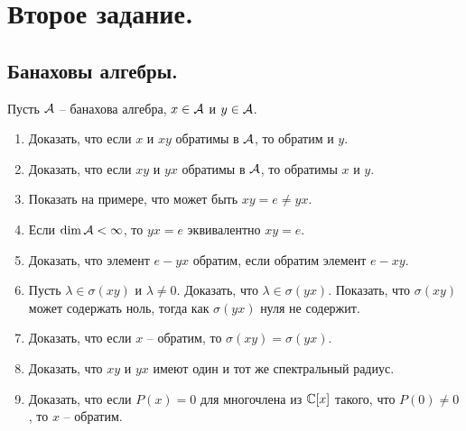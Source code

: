 \chapter{Второе задание.}
\section{Банаховы алгебры.}
\begin{task}[T1]
    Пусть $\mathcal{A}$ -- банахова алгебра, $x \in \mathcal{A}$ и $y \in \mathcal{A}$.
    \begin{enumerate}
        \item Доказать, что если $x$ и $xy$ обратимы в $\mathcal{A}$, то обратим и $y$.
        \item Доказать, что если $xy$ и $yx$ обратимы в $\mathcal{A}$, то обратимы $x$ и $y$.
        \item Показать на примере, что может быть $xy = e \neq yx$.
        \item Если $\dim \mathcal{A} < \infty$, то $yx = e$ эквивалентно $xy = e$.
        \item Доказать, что элемент $e - yx$ обратим, если обратим элемент $e - xy$.
        \item Пусть $\lambda \in \sigma(xy)$ и $\lambda \neq 0$.
        Доказать, что $\lambda \in \sigma(yx)$.
        Показать, что $\sigma(xy)$ может содержать ноль, тогда как $\sigma(yx)$ нуля не содержит.
        \item Доказать, что если $x$ -- обратим, то $\sigma(xy) = \sigma(yx)$.
        \item Доказать, что $xy$ и $yx$ имеют один и тот же спектральный радиус.
        \item Доказать, что если $P(x) = 0$ для многочлена из $\mathbb{C}[x]$ такого, что $P(0) \neq 0$, то $x$ -- обратим.
    \end{enumerate}
\end{task}
